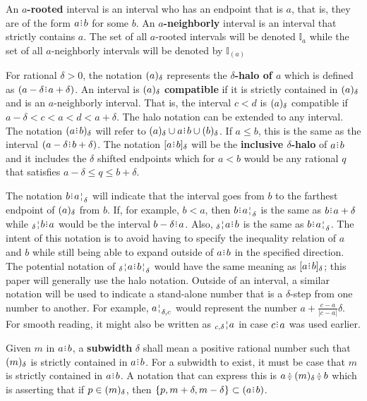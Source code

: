 \documentclass[12pt]{article}
\begin{document}
An \textbf{$a$-rooted} interval is an interval who has an endpoint that is $a$, that is, they are of the form $a\rint b$ for some $b$. An  \textbf{$a$-neighborly} interval is an interval that strictly contains $a$. The set of all $a$-rooted intervals will be denoted $\mathbb{I}_a$ while the set of all $a$-neighborly intervals will be denoted by $\mathbb{I}_{(a)}$

For rational $\delta > 0$, the notation $(a)_{\delta}$ represents the \textbf{$\delta$-halo of $a$} which is defined as $(a -\delta \rint  a+ \delta)$. An interval is $(a)_{\delta}$ \textbf{compatible }if it is strictly contained in $(a)_{\delta}$ and is an $a$-neighborly interval. That is, the interval $c \lt d$ is $(a)_{\delta}$ compatible if $a- \delta < c < a < d < a+ \delta$. The halo notation can be extended to any interval. The notation $\halo{a\rint b}$ will refer to $\halo{a} \cup a\rint b \cup \halo{b}$. If $a \leq b$, this is the same as the interval $(a-\delta\rint b+\delta)$. The notation $\clhalo{a\rint b}$ will be the \textbf{inclusive $\delta$-halo} of $a\rint b$ and it includes the $\delta$ shifted endpoints which for $a \lt b$ would be any rational $q$ that satisfies $a - \delta \leq q \leq b+ \delta$. 


The notation $b\rint \fuzbright{a}$ will indicate that the interval goes from $b$ to the farthest endpoint of $(a)_{\delta}$ from $b$. If, for example, $b < a$, then $b\rint \fuzbright{a}$ is the same as $b\rint a+\delta$ while $\fuzbleft{b} \rint a$ would be the interval $b-\delta\rint a$. Also, $\fuzbleft{a} \rint  b$ is the same as $b\rint \fuzbright{a}$.  The intent of this notation is to avoid having to specify the inequality relation of $a$ and $b$ while still being able to expand outside of $a\rint b$ in the specified direction. The potential notation of $\fuzbleft{a}\rint \fuzbright{b}$ would have the same meaning as $[a\rint b]_\delta$; this paper will generally use the halo notation. Outside of an interval, a similar notation will be used to indicate a stand-alone number that is a $\delta$-step from one number to another. For example, $\fuzbright[\delta,c]{a}$ would represent the number $a + \frac{c-a}{|c-a|}\delta$. For smooth reading, it might also be written as $\fuzbleft[c, \delta]{a}$ in case $c \rint a$ was used earlier. 

Given $m$ in $a \rint  b$, a \textbf{subwidth} $\delta$ shall mean a positive rational number such that $(m)_{\delta}$ is strictly contained in $a\rint b$. For a subwidth to exist, it must be case that $m$ is strictly contained in $a\rint b$. A notation that can express this is $a \betneq \halo{m} \betneq b$ which is asserting that if $p \in (m)_{\delta}$, then $\{p, m+\delta, m- \delta\} \subset (a\rint b)$. 
\end{document}
